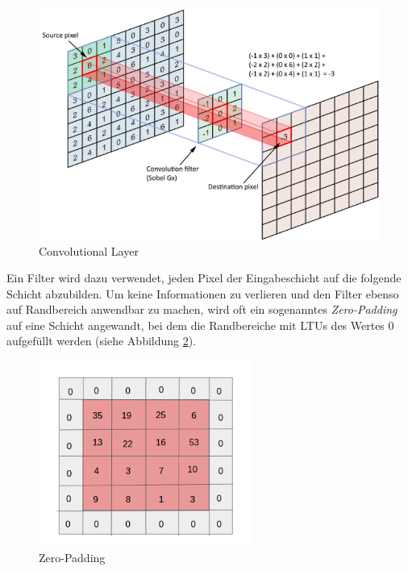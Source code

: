 \begin{figure}[ht]
	\begin{center}
		\includegraphics[width=12cm]{Bilder/convolutional_layer.png} 
		\caption[Convolutional Layer]{Convolutional Layer \cite{DaphneCornelisse.20180424}}
		\label{convolutional_layer}
	\end{center}
\end{figure}

Ein Filter wird dazu verwendet, jeden Pixel der Eingabeschicht auf die folgende Schicht abzubilden. Um keine Informationen zu verlieren und den Filter ebenso auf Randbereich anwendbar zu machen, wird oft ein sogenanntes \textit{Zero-Padding} auf eine Schicht angewandt, bei dem die Randbereiche mit LTUs des Wertes 0 aufgefüllt werden (siehe Abbildung \ref{zero_padding}). \cite[S. 362]{AurelienGeron.2018}

\begin{figure}[ht]
	\begin{center}
		\includegraphics[width=7cm]{Bilder/zero_padding.png} 
		\caption[Zero-Padding]{Zero-Padding \cite{AbhineetSaxena.20160629}}
		\label{zero_padding}
	\end{center}
\end{figure}

